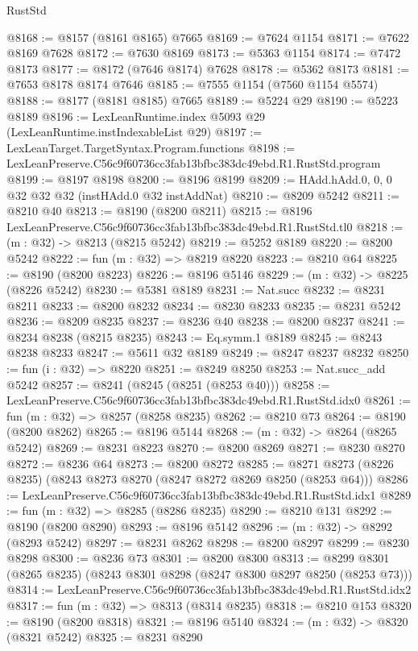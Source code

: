 \begin{lexlean}{RustStd}
\begin{coremodule}
@8168 := @8157 (@8161 @8165) @7665
@8169 := @7624 @1154
@8171 := @7622 @8169 @7628
@8172 := @7630 @8169
@8173 := @5363 @1154
@8174 := @7472 @8173
@8177 := @8172 (@7646 @8174) @7628
@8178 := @5362 @8173
@8181 := @7653 @8178 @8174 @7646
@8185 := @7555 @1154 (@7560 @1154 @5574)
@8188 := @8177 (@8181 @8185) @7665
@8189 := @5224 @29
@8190 := @5223 @8189
@8196 := LexLeanRuntime.index @5093 @29 (LexLeanRuntime.instIndexableList @29)
@8197 := LexLeanTarget.TargetSyntax.Program.functions
@8198 := LexLeanPreserve.C56c9f60736cc3fab13bfbc383dc49ebd.R1.RustStd.program
@8199 := @8197 @8198
@8200 := @8196 @8199
@8209 := HAdd.hAdd.{0, 0, 0} @32 @32 @32 (instHAdd.{0} @32 instAddNat)
@8210 := @8209 @5242
@8211 := @8210 @40
@8213 := @8190 (@8200 @8211)
@8215 := @8196 LexLeanPreserve.C56c9f60736cc3fab13bfbc383dc49ebd.R1.RustStd.tl0
@8218 := (m : @32) -> @8213 (@8215 @5242)
@8219 := @5252 @8189
@8220 := @8200 @5242
@8222 := fun (m : @32) => @8219 @8220
@8223 := @8210 @64
@8225 := @8190 (@8200 @8223)
@8226 := @8196 @5146
@8229 := (m : @32) -> @8225 (@8226 @5242)
@8230 := @5381 @8189
@8231 := Nat.succ
@8232 := @8231 @8211
@8233 := @8200 @8232
@8234 := @8230 @8233
@8235 := @8231 @5242
@8236 := @8209 @8235
@8237 := @8236 @40
@8238 := @8200 @8237
@8241 := @8234 @8238 (@8215 @8235)
@8243 := Eq.symm.{1} @8189
@8245 := @8243 @8238 @8233
@8247 := @5611 @32 @8189
@8249 := @8247 @8237 @8232
@8250 := fun (i : @32) => @8220
@8251 := @8249 @8250
@8253 := Nat.succ_add @5242
@8257 := @8241 (@8245 (@8251 (@8253 @40)))
@8258 := LexLeanPreserve.C56c9f60736cc3fab13bfbc383dc49ebd.R1.RustStd.idx0
@8261 := fun (m : @32) => @8257 (@8258 @8235)
@8262 := @8210 @73
@8264 := @8190 (@8200 @8262)
@8265 := @8196 @5144
@8268 := (m : @32) -> @8264 (@8265 @5242)
@8269 := @8231 @8223
@8270 := @8200 @8269
@8271 := @8230 @8270
@8272 := @8236 @64
@8273 := @8200 @8272
@8285 := @8271 @8273 (@8226 @8235) (@8243 @8273 @8270 (@8247 @8272 @8269 @8250 (@8253 @64)))
@8286 := LexLeanPreserve.C56c9f60736cc3fab13bfbc383dc49ebd.R1.RustStd.idx1
@8289 := fun (m : @32) => @8285 (@8286 @8235)
@8290 := @8210 @131
@8292 := @8190 (@8200 @8290)
@8293 := @8196 @5142
@8296 := (m : @32) -> @8292 (@8293 @5242)
@8297 := @8231 @8262
@8298 := @8200 @8297
@8299 := @8230 @8298
@8300 := @8236 @73
@8301 := @8200 @8300
@8313 := @8299 @8301 (@8265 @8235) (@8243 @8301 @8298 (@8247 @8300 @8297 @8250 (@8253 @73)))
@8314 := LexLeanPreserve.C56c9f60736cc3fab13bfbc383dc49ebd.R1.RustStd.idx2
@8317 := fun (m : @32) => @8313 (@8314 @8235)
@8318 := @8210 @153
@8320 := @8190 (@8200 @8318)
@8321 := @8196 @5140
@8324 := (m : @32) -> @8320 (@8321 @5242)
@8325 := @8231 @8290

\end{coremodule}
\end{lexlean}
